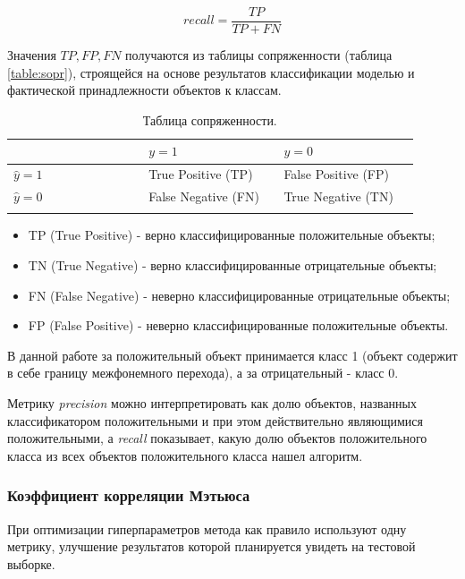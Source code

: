\documentclass[utf8x, 14pt, oneside, a4paper]{article}
\begin{document}
	\begin{equation}
		recall = \frac{TP}{TP+FN}
	\end{equation}

	Значения $TP, FP, FN$ получаются из таблицы сопряженности (таблица \ref{table:sopr}), строящейся на основе результатов классификации моделью и фактической принадлежности объектов к классам.
	
	\begin{center}
		\begin{longtable}[h!]{|p{0.3\linewidth}|p{0.3\linewidth}|p{0.3\linewidth}|}
			\hline
			{} & {$y = 1$} & {$y = 0$}\\
			\hline
			{$\hat{y} = 1$} & {True Positive (TP)} & {False Positive (FP)}\\
			\hline
			{$\hat{y} = 0$} & {False Negative (FN)} & {True Negative (TN)}\\
			\hline
			\caption{Таблица сопряженности.}
		\end{longtable}\label{table:sopr}
	\end{center}

	\begin{itemize}
		\item TP (True Positive) - верно классифицированные положительные объекты;
		\item TN (True Negative) - верно классифицированные отрицательные объекты;
		\item FN (False Negative) - неверно классифицированные отрицательные объекты;
		\item FP (False Positive) - неверно классифицированные положительные объекты.
	\end{itemize}

	В данной работе за положительный объект принимается класс 1 (объект содержит в себе границу межфонемного перехода), а за отрицательный - класс 0.
	
	Метрику \textit{precision} можно интерпретировать как долю объектов, названных классификатором положительными и при этом действительно являющимися положительными, а \textit{recall} показывает, какую долю объектов положительного класса из всех объектов положительного класса нашел алгоритм.
	
	\subsubsection{Коэффициент корреляции Мэтьюса} \label{met}
	
	При оптимизации гиперпараметров метода как правило используют одну метрику, улучшение результатов которой планируется увидеть на тестовой выборке.
	
\end{document}
